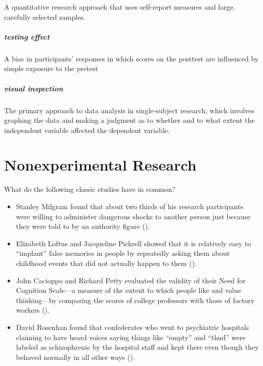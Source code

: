 \documentclass[
]{krantz}
\providecommand{\tightlist}{%
  \setlength{\itemsep}{0pt}\setlength{\parskip}{0pt}}
\begin{document}
A quantitative research approach that uses self-report measures and large, carefully selected samples.

\paragraph*{testing effect}\label{testing-effect}

A bias in participants' responses in which scores on the posttest are influenced by simple exposure to the pretest

\paragraph*{visual inspection}\label{visual-inspection}

The primary approach to data analysis in single-subject research, which involves graphing the data and making a judgment as to whether and to what extent the independent variable affected the dependent variable.

\chapter{Nonexperimental Research}\label{nonexperimental-research-1}

What do the following classic studies have in common?

\begin{itemize}
\tightlist
\item
  Stanley Milgram found that about two thirds of his research participants were willing to administer dangerous shocks to another person just because they were told to by an authority figure ().
\item
  Elizabeth Loftus and Jacqueline Pickrell showed that it is relatively easy to ``implant'' false memories in people by repeatedly asking them about childhood events that did not actually happen to them ().
\item
  John Cacioppo and Richard Petty evaluated the validity of their Need for Cognition Scale---a measure of the extent to which people like and value thinking---by comparing the scores of college professors with those of factory workers ().
\item
  David Rosenhan found that confederates who went to psychiatric hospitals claiming to have heard voices saying things like ``empty'' and ``thud'' were labeled as schizophrenic by the hospital staff and kept there even though they behaved normally in all other ways ().
\end{itemize}
\end{document}

